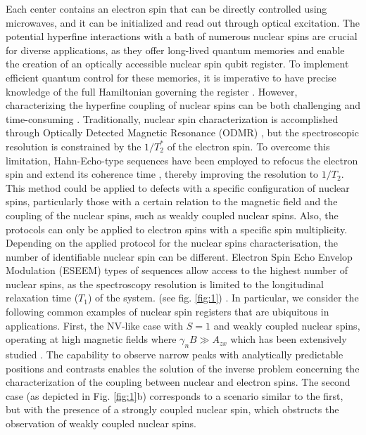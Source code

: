 \documentclass[%
 reprint,
superscriptaddress,
 amsmath,amssymb,
 aps,
]{revtex4-2}
\begin{document}
Each center contains an electron spin that can be directly controlled using microwaves, and it can be initialized and read out through optical excitation. 
The potential hyperfine interactions with a bath of numerous nuclear spins are crucial for diverse applications, as they offer long-lived quantum memories and enable the creation of an optically accessible nuclear spin qubit register.
To implement efficient quantum control for these memories, it is imperative to have precise knowledge of the full Hamiltonian governing the register \cite{vorobyov2023transition,bradley2022robust}.
However, characterizing the hyperfine coupling of nuclear spins can be both challenging and time-consuming \cite{abobeih2019atomic, van2023mapping}. 
Traditionally, nuclear spin characterization is accomplished through Optically Detected Magnetic Resonance (ODMR) \cite{Dreau:2012aa,hesselmeier2023measuring}, but the spectroscopic resolution is constrained by the $1/T_2^\ast$ of the electron spin. 
To overcome this limitation, Hahn-Echo-type sequences have been employed to refocus the electron spin and extend its coherence time \cite{childress2006coherent}, thereby improving the resolution to $1/T_2$. 
This method could be applied to defects with a specific configuration of nuclear spins, particularly those with a certain relation to the magnetic field and the coupling of the nuclear spins, such as weakly coupled nuclear spins.
Also, the protocols can only be applied to electron spins with a specific spin multiplicity.
Depending on the applied protocol for the nuclear spins characterisation, the number of identifiable nuclear spin can be different.
Electron Spin Echo Envelop Modulation (ESEEM) types of sequences allow access to the highest number of nuclear spins, as the spectroscopy resolution is limited to the longitudinal relaxation time ($T_1$) of the system. (see fig. \ref{fig:1}) \cite{laraoui2013high, vorobyov2022addressing}.
In particular, we consider the following common examples of nuclear spin registers that are ubiquitous in applications. First, the NV-like case with $S=1$ and weakly coupled nuclear spins, operating at high magnetic fields where $\gamma_n B \gg A_{zx}$ which has been extensively studied \cite{abobeih2019atomic, taminiau2012detection, Zhao:2014aa}.
The capability to observe narrow peaks with analytically predictable positions and contrasts enables the solution of the inverse problem concerning the characterization of the coupling between nuclear and electron spins. 
The second case (as depicted in Fig. \ref{fig:1}b) corresponds to a scenario similar to the first, but with the presence of a strongly coupled nuclear spin, which obstructs the observation of weakly coupled nuclear spins.
\end{document}
